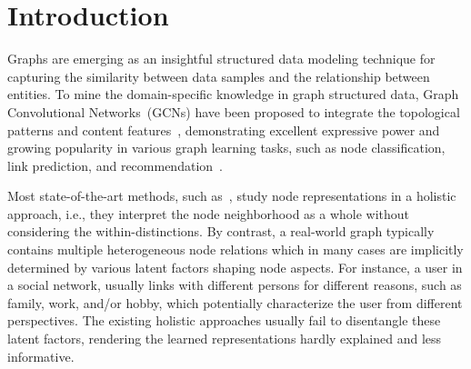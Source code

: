 \documentclass[accepted]{uai2021} %
\begin{document}
\begin{abstract}
\end{abstract}

\section{Introduction}
Graphs are emerging as an insightful structured data modeling technique for capturing the similarity between data samples and the relationship between entities. To mine the domain-specific knowledge in graph structured data, Graph Convolutional Networks~(GCNs) have been proposed to integrate the topological patterns and content features~\citep{Kipf2017SemiSupervisedCW}, demonstrating excellent expressive power and growing popularity in various graph learning tasks, such as node classification, link prediction, and recommendation~\citep{Wu2020ACS,chen2020handling}.

Most state-of-the-art methods, such as~\citep{Kipf2017SemiSupervisedCW,Hamilton2017InductiveRL,Velickovic2018GraphAN}, study node representations in a holistic approach, i.e., they interpret the node neighborhood as a whole without considering the within-distinctions. By contrast, a real-world graph typically contains multiple heterogeneous node relations which in many cases are implicitly determined by various latent factors shaping node aspects. For instance, a user in a social network, usually links with different persons for different reasons, such as family, work, and/or hobby, which potentially characterize the user from different perspectives. The existing holistic approaches usually fail to disentangle these latent factors, rendering the learned representations hardly explained and less informative.
\end{document}
